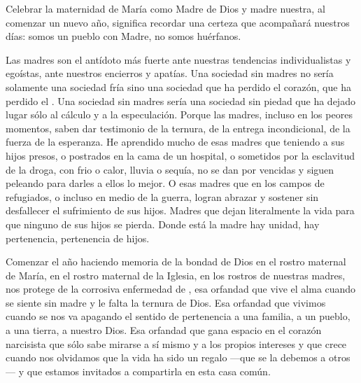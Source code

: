 \begin{body}
	Celebrar la maternidad de María como Madre de Dios y madre nuestra, al comenzar un nuevo año, significa recordar una certeza que acompañará nuestros días: somos un pueblo con Madre, no somos huérfanos.
	
	Las madres son el antídoto más fuerte ante nuestras tendencias individualistas y egoístas, ante nuestros encierros y apatías. Una sociedad sin madres no sería solamente una sociedad fría sino una sociedad que ha perdido el corazón, que ha perdido el . Una sociedad sin madres sería una sociedad sin piedad que ha dejado lugar sólo al cálculo y a la especulación. Porque las madres, incluso en los peores momentos, saben dar testimonio de la ternura, de la entrega incondicional, de la fuerza de la esperanza. He aprendido mucho de esas madres que teniendo a sus hijos presos, o postrados en la cama de un hospital, o sometidos por la esclavitud de la droga, con frio o calor, lluvia o sequía, no se dan por vencidas y siguen peleando para darles a ellos lo mejor. O esas madres que en los campos de refugiados, o incluso en medio de la guerra, logran abrazar y sostener sin desfallecer el sufrimiento de sus hijos. Madres que dejan literalmente la vida para que ninguno de sus hijos se pierda. Donde está la madre hay unidad, hay pertenencia, pertenencia de hijos.
	
	Comenzar el año haciendo memoria de la bondad de Dios en el rostro maternal de María, en el rostro maternal de la Iglesia, en los rostros de nuestras madres, nos protege de la corrosiva enfermedad de , esa orfandad que vive el alma cuando se siente sin madre y le falta la ternura de Dios. Esa orfandad que vivimos cuando se nos va apagando el sentido de pertenencia a una familia, a un pueblo, a una tierra, a nuestro Dios. Esa orfandad que gana espacio en el corazón narcisista que sólo sabe mirarse a sí mismo y a los propios intereses y que crece cuando nos olvidamos que la vida ha sido un regalo ---que se la debemos a otros--- y que estamos invitados a compartirla en esta casa común.
	

\end{body}
